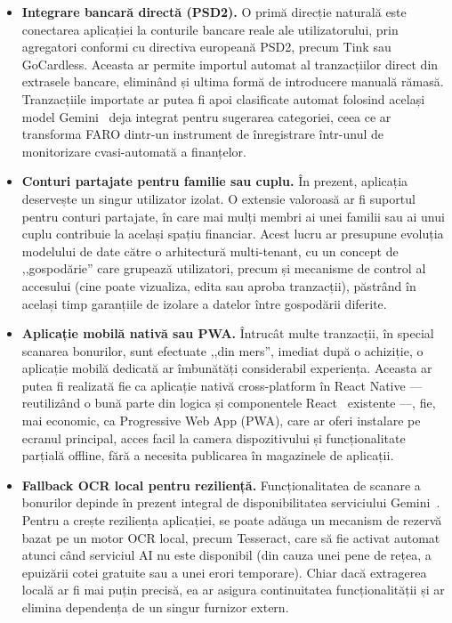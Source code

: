 \documentclass[12pt,a4paper,oneside]{report}
\begin{document}
\begin{itemize}[leftmargin=2cm,itemsep=4pt]
  \item \textbf{Integrare bancară directă (PSD2).} O primă direcție naturală este conectarea aplicației la conturile bancare reale ale utilizatorului, prin agregatori conformi cu directiva europeană PSD2, precum Tink sau GoCardless. Aceasta ar permite importul automat al tranzacțiilor direct din extrasele bancare, eliminând și ultima formă de introducere manuală rămasă. Tranzacțiile importate ar putea fi apoi clasificate automat folosind același model Gemini~\cite{ref:gemini} deja integrat pentru sugerarea categoriei, ceea ce ar transforma FARO dintr-un instrument de înregistrare într-unul de monitorizare cvasi-automată a finanțelor.

  \item \textbf{Conturi partajate pentru familie sau cuplu.} În prezent, aplicația deservește un singur utilizator izolat. O extensie valoroasă ar fi suportul pentru conturi partajate, în care mai mulți membri ai unei familii sau ai unui cuplu contribuie la același spațiu financiar. Acest lucru ar presupune evoluția modelului de date către o arhitectură multi-tenant, cu un concept de ,,gospodărie'' care grupează utilizatori, precum și mecanisme de control al accesului (cine poate vizualiza, edita sau aproba tranzacții), păstrând în același timp garanțiile de izolare a datelor între gospodării diferite.

  \item \textbf{Aplicație mobilă nativă sau PWA.} Întrucât multe tranzacții, în special scanarea bonurilor, sunt efectuate ,,din mers'', imediat după o achiziție, o aplicație mobilă dedicată ar îmbunătăți considerabil experiența. Aceasta ar putea fi realizată fie ca aplicație nativă cross-platform în React Native --- reutilizând o bună parte din logica și componentele React~\cite{ref:react} existente ---, fie, mai economic, ca Progressive Web App (PWA), care ar oferi instalare pe ecranul principal, acces facil la camera dispozitivului și funcționalitate parțială offline, fără a necesita publicarea în magazinele de aplicații.

  \item \textbf{Fallback OCR local pentru reziliență.} Funcționalitatea de scanare a bonurilor depinde în prezent integral de disponibilitatea serviciului Gemini~\cite{ref:gemini}. Pentru a crește reziliența aplicației, se poate adăuga un mecanism de rezervă bazat pe un motor OCR local, precum Tesseract, care să fie activat automat atunci când serviciul AI nu este disponibil (din cauza unei pene de rețea, a epuizării cotei gratuite sau a unei erori temporare). Chiar dacă extragerea locală ar fi mai puțin precisă, ea ar asigura continuitatea funcționalității și ar elimina dependența de un singur furnizor extern.


\end{itemize}
\end{document}
